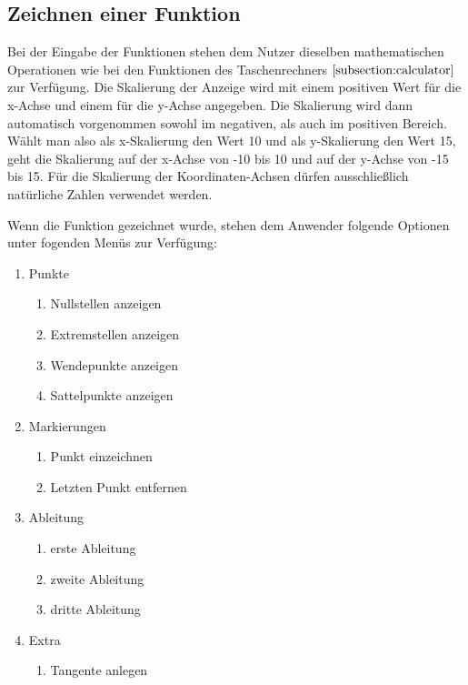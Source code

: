 \documentclass[12pt,a4paper]{article}
\begin{document}
    \subsection{Zeichnen einer Funktion}
    Bei der Eingabe der Funktionen stehen dem Nutzer dieselben mathematischen Operationen wie bei den Funktionen
    des Taschenrechners $\ref{subsection:calculator}$ zur Verfügung.
    Die Skalierung der Anzeige wird mit einem positiven Wert für die x-Achse und einem für die y-Achse angegeben.
    Die Skalierung wird dann automatisch vorgenommen sowohl im negativen, als auch im positiven Bereich.
    Wählt man also als x-Skalierung den Wert 10 und als y-Skalierung den Wert 15,
    geht die Skalierung auf der x-Achse von -10 bis 10 und auf der y-Achse von -15 bis 15.
    Für die Skalierung der Koordinaten-Achsen dürfen ausschließlich natürliche Zahlen verwendet werden.\par

    \newpage

    Wenn die Funktion gezeichnet wurde, stehen dem Anwender folgende Optionen unter fogenden Menüs zur Verfügung:

        {
        \renewcommand{\labelenumi}{\bf \Alph{enumi}}
        \renewcommand{\labelenumii}{\arabic{enumii}}

        \begin{enumerate}
            \item Punkte
            \begin{enumerate}
                \item Nullstellen anzeigen
                \item Extremstellen anzeigen
                \item Wendepunkte anzeigen
                \item Sattelpunkte anzeigen
            \end{enumerate}

            \item Markierungen
            \begin{enumerate}
                \item Punkt einzeichnen
                \item Letzten Punkt entfernen
            \end{enumerate}

            \item Ableitung
            \begin{enumerate}
                \item erste Ableitung
                \item zweite Ableitung
                \item dritte Ableitung
            \end{enumerate}
            \item Extra
            \begin{enumerate}
                \item Tangente anlegen
            \end{enumerate}
        \end{enumerate}
    }
\end{document}
